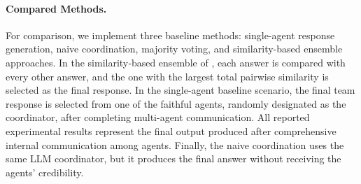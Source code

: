 
\paragraph{Compared Methods.} For comparison, we implement three baseline methods: single-agent response generation, naive coordination, majority voting, and similarity-based ensemble  approaches. In the similarity‑based ensemble of \cite{more-agents}, each answer is compared with every other answer, and the one with the largest total pairwise similarity is selected as the final response. In the single-agent baseline scenario, the final team response is selected from one of the faithful agents, randomly designated as the coordinator, after completing multi-agent communication. All reported experimental results represent the final output produced after comprehensive internal communication among agents. Finally, the naive coordination uses the same LLM coordinator, but it produces the final answer without receiving the agents’ credibility. 

